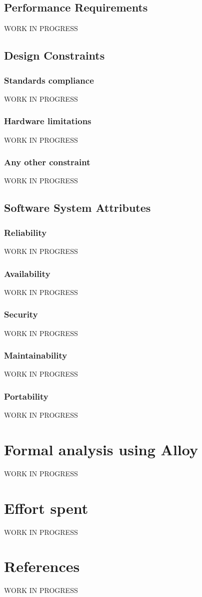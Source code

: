 \documentclass{report}
\begin{document}
		\section{Performance Requirements}
		WORK IN PROGRESS
		\section{Design Constraints}
			\subsection{Standards compliance}
			WORK IN PROGRESS
			\subsection{Hardware limitations}
			WORK IN PROGRESS
			\subsection{Any other constraint}
			WORK IN PROGRESS
		\section{Software System Attributes}
			\subsection{Reliability}
			WORK IN PROGRESS
			\subsection{Availability}
			WORK IN PROGRESS
			\subsection{Security}
			WORK IN PROGRESS
			\subsection{Maintainability}
			WORK IN PROGRESS
			\subsection{Portability}
			WORK IN PROGRESS
	\chapter{Formal analysis using Alloy}
	WORK IN PROGRESS
	\chapter{Effort spent}
	WORK IN PROGRESS
	\chapter{References}
	WORK IN PROGRESS
	
\end{document}
